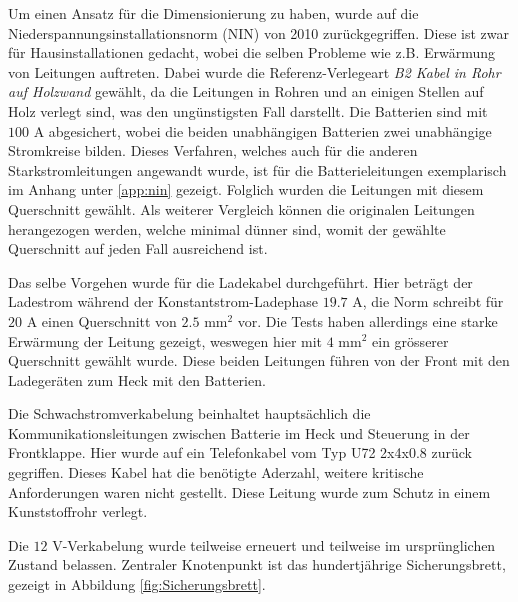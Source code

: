 Um einen Ansatz für die Dimensionierung zu haben, wurde auf die Niederspannungsinstallationsnorm (NIN) von 2010 \cite{NIN} zurückgegriffen. Diese ist zwar für Hausinstallationen gedacht, wobei die selben Probleme wie z.B. Erwärmung von Leitungen auftreten. Dabei wurde die Referenz-Verlegeart \textit{B2 Kabel in Rohr auf Holzwand} gewählt, da die Leitungen in Rohren und an einigen Stellen auf Holz verlegt sind, was den ungünstigsten Fall darstellt. Die Batterien sind mit $100$ A abgesichert, wobei die beiden unabhängigen Batterien zwei unabhängige Stromkreise bilden. Dieses Verfahren, welches auch für die anderen Starkstromleitungen angewandt wurde, ist für die Batterieleitungen exemplarisch im Anhang unter \ref{app:nin} gezeigt. Folglich wurden die Leitungen mit diesem Querschnitt gewählt. Als weiterer Vergleich können die originalen Leitungen herangezogen werden, welche minimal dünner sind, womit der gewählte Querschnitt auf jeden Fall ausreichend ist.

Das selbe Vorgehen wurde für die Ladekabel durchgeführt. Hier beträgt der Ladestrom während der Konstantstrom-Ladephase $19.7$ A, die Norm schreibt für $20$ A einen Querschnitt von $2.5$ mm$^2$ vor. Die Tests haben allerdings eine starke Erwärmung der Leitung gezeigt, weswegen hier mit $4$ mm$^2$ ein grösserer Querschnitt gewählt wurde. Diese beiden Leitungen führen von der Front mit den Ladegeräten zum Heck mit den Batterien.

Die Schwachstromverkabelung beinhaltet hauptsächlich die Kommunikationsleitungen zwischen Batterie im Heck und Steuerung in der Frontklappe. Hier wurde auf ein Telefonkabel vom Typ U72 2x4x0.8 \cite{u72} zurück gegriffen. Dieses Kabel hat die benötigte Aderzahl, weitere kritische Anforderungen waren nicht gestellt. Diese Leitung wurde zum Schutz in einem Kunststoffrohr verlegt.

Die $12$ V-Verkabelung wurde teilweise erneuert und teilweise im ursprünglichen Zustand belassen. Zentraler Knotenpunkt ist das hundertjährige Sicherungsbrett, gezeigt in Abbildung \ref{fig:Sicherungsbrett}.

